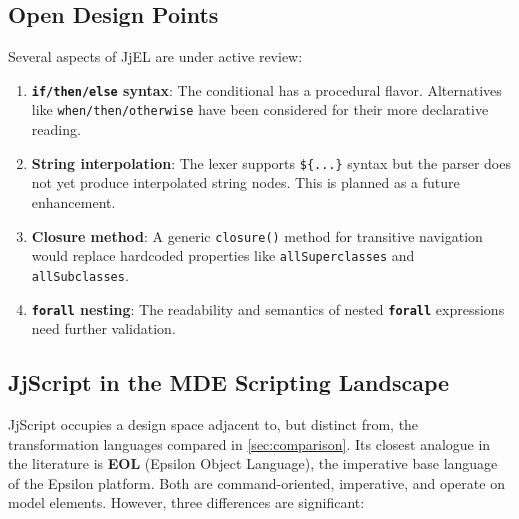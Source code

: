 \documentclass[11pt,a4paper]{article}
\newcommand{\jjscript}{\textsf{JjScript}}
\newcommand{\jjel}{\textsf{JjEL}}
\newcommand{\kw}[1]{\texttt{\textbf{#1}}}
\begin{document}
\subsection{Open Design Points}

Several aspects of \jjel{} are under active review:

\begin{enumerate}
    \item \textbf{\texttt{if/then/else} syntax}: The conditional has a procedural flavor. Alternatives like \texttt{when/then/otherwise} have been considered for their more declarative reading.

    \item \textbf{String interpolation}: The lexer supports \texttt{\$\{...\}} syntax but the parser does not yet produce interpolated string nodes. This is planned as a future enhancement.

    \item \textbf{Closure method}: A generic \texttt{closure()} method for transitive navigation would replace hardcoded properties like \texttt{allSuperclasses} and \texttt{allSubclasses}.

    \item \textbf{\kw{forall} nesting}: The readability and semantics of nested \kw{forall} expressions need further validation.
\end{enumerate}

\subsection{JjScript in the MDE Scripting Landscape}

\jjscript{} occupies a design space adjacent to, but distinct from, the
transformation languages compared in \cref{sec:comparison}. Its closest
analogue in the literature is \textbf{EOL} (Epsilon Object Language), the
imperative base language of the Epsilon platform. Both are command-oriented,
imperative, and operate on model elements. However, three differences are
significant:
\end{document}
